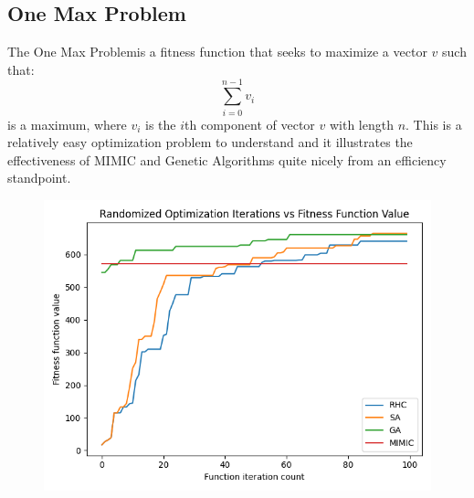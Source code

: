 \documentclass[11pt]{article}
\newcommand{\problemone}{One Max Problem}
\begin{document}
    \subsection{\problemone}
    The \problemone is a fitness function that seeks to maximize a vector $v$ such that:
    \begin{equation}
        \label{oneMax}
        \sum_{i=0}^{n-1} v_i
    \end{equation}
    is a maximum, where $v_i$ is the $i$th component of vector $v$ with length $n$.
    This is a relatively easy optimization problem to understand and it illustrates the effectiveness of MIMIC and Genetic Algorithms
    quite nicely from an efficiency standpoint.
    \linebreak
    \begin{figure}
        \includegraphics[scale=0.5]{onemax.png}\label{fig:oneMax}
    \end{figure}
\end{document}

